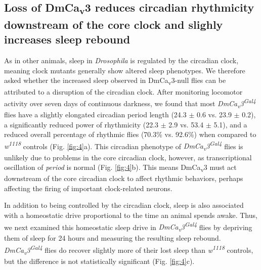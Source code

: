 \subsection*{Loss of DmCa\textsubscript{v}3 reduces circadian rhythmicity downstream of the core clock and slighly increases sleep rebound}

As in other animals, sleep in \emph{Drosophila} is regulated by the circadian clock, meaning clock mutants generally show altered sleep phenotypes\cite{hendricks:2003aa, parisky:2008aa}.
We therefore asked whether the increased sleep observed in DmCa\textsubscript{v}3-null flies can be attributed to a disruption of the circadian clock.
After monitoring locomotor activity over seven days of continuous darkness, we found that most \emph{DmCa\textsubscript{v}3\textsuperscript{Gal4}} flies have a slightly elongated circadian period length (24.3 $\pm$ 0.6 vs. 23.9 $\pm$ 0.2), a significantly reduced power of rhythmicity (22.3 $\pm$ 2.9 vs. 53.4 $\pm$ 5.1), and a reduced overall percentage of rhythmic flies (70.3\% vs. 92.6\%) when compared to \emph{w\textsuperscript{1118}} controls (Fig. \ref{fig:4}a).
This circadian phenotype of \emph{DmCa\textsubscript{v}3\textsuperscript{Gal4}} flies is unlikely due to problems in the core circadian clock, however, as transcriptional oscillation of \emph{period} is normal (Fig. \ref{fig:4}b).
This means DmCa\textsubscript{v}3 must act downstream of the core circadian clock to affect rhythmic behaviors, perhaps affecting the firing of important clock-related neurons.

In addition to being controlled by the circadian clock, sleep is also associated with a homeostatic drive proportional to the time an animal spends awake. Thus, we next examined this homeostatic sleep drive in \emph{DmCa\textsubscript{v}3\textsuperscript{Gal4}} flies by depriving them of sleep for 24 hours and measuring the resulting sleep rebound. \emph{DmCa\textsubscript{v}3\textsuperscript{Gal4}} flies do recover slightly more of their lost sleep than \emph{w\textsuperscript{1118}} controls, but the difference is not statistically significant (Fig. \ref{fig:4}c).
